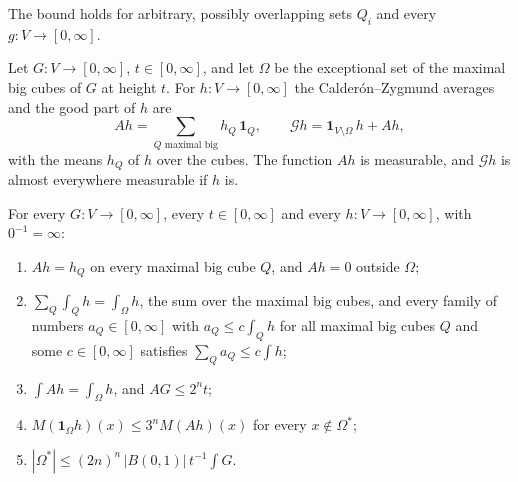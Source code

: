 The bound holds for arbitrary, possibly overlapping sets $Q_i$ and every
$g : V \to [0, \infty]$.

\begin{definition}
\label{def:calderon-zygmund-good-part}
\leanok
{}
Let $G : V \to [0, \infty]$, $t \in [0, \infty]$, and let $\Omega$ be the exceptional set of
the maximal big cubes of $G$ at height $t$. For $h : V \to [0, \infty]$ the
Calder\'on--Zygmund averages and the good part of $h$ are
\[
  A h = \sum_{Q \text{ maximal big}} h_Q \, \mathbf 1_Q,
  \qquad
  \mathcal G h = \mathbf 1_{V \setminus \Omega} \, h + A h,
\]
with the means $h_Q$ of $h$ over the cubes. The function $A h$ is measurable, and $\mathcal G h$
is almost everywhere measurable if $h$ is.
\end{definition}

\begin{lemma}
\label{lem:calderon-zygmund-averages}
\leanok
{}
For every $G : V \to [0, \infty]$, every $t \in [0, \infty]$ and every $h : V \to [0, \infty]$,
with $0^{-1} = \infty$:
\begin{enumerate}
  \item $A h = h_Q$ on every maximal big cube $Q$, and $A h = 0$ outside $\Omega$;
  \item $\sum_Q \int_Q h = \int_\Omega h$, the sum over the maximal big cubes, and every family of
    numbers $a_Q \in [0, \infty]$ with $a_Q \leq c \int_Q h$ for all maximal big cubes $Q$ and
    some $c \in [0, \infty]$ satisfies $\sum_Q a_Q \leq c \int h$;
  \item $\int A h = \int_\Omega h$, and $A G \leq 2^n t$;
  \item $M(\mathbf 1_\Omega h)(x) \leq 3^n M(A h)(x)$ for every $x \notin \Omega^*$;
  \item $|\Omega^*| \leq (2n)^n \, |B(0, 1)| \, t^{-1} \int G$.
\end{enumerate}
\end{lemma}

